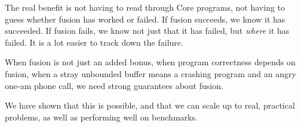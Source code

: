 The real benefit is not having to read through Core programs, not having to guess whether fusion has worked or failed.
If fusion succeeds, we know it has succeeded.
If fusion fails, we know not just that it has failed, but \emph{where} it has failed.
It is a lot easier to track down the failure.

When fusion is not just an added bonus, when program correctness depends on fusion, when a stray unbounded buffer means a crashing program and an angry one-am phone call, we need strong guarantees about fusion.

We have shown that this is possible, and that we can scale up to real, practical problems, as well as performing well on benchmarks.


